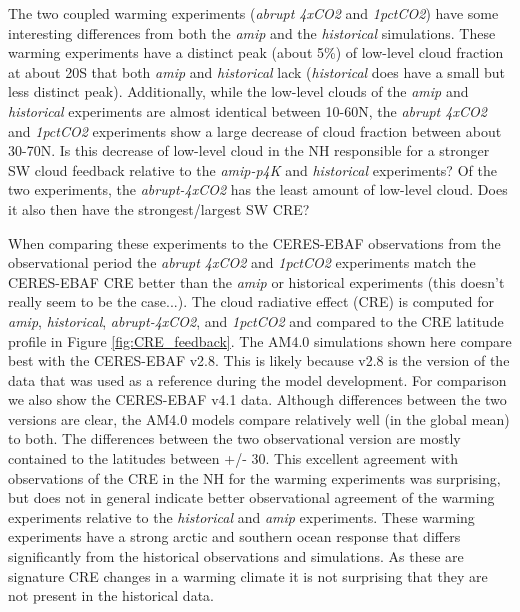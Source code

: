 \documentclass[draft]{agujournal2019}
\begin{document}
The two coupled warming experiments (\textit{abrupt 4xCO2} and \textit{1pctCO2}) have some interesting 
differences from both the \textit{amip} and the \textit{historical} simulations.   
These warming experiments have a distinct peak (about 5\%) of low-level cloud fraction 
 at about 20S that both \textit{amip} and \textit{historical} lack (\textit{historical} does have a small but less distinct peak).  
 Additionally, while the low-level clouds of the \textit{amip} and \textit{historical} experiments are almost identical between 
 10-60N, the \textit{abrupt 4xCO2} and \textit{1pctCO2} experiments show a large decrease of cloud fraction between 
 about 30-70N.  Is this decrease of low-level cloud in the NH responsible for a stronger SW cloud feedback relative to the 
 \textit{amip-p4K} and \textit{historical} experiments?  Of the two experiments, the \textit{abrupt-4xCO2} has the 
 least amount of low-level cloud.   Does it also then have the strongest/largest SW CRE?  
 
 When comparing these experiments to the CERES-EBAF observations from the observational period the 
 \textit{abrupt 4xCO2} and \textit{1pctCO2} experiments match the CERES-EBAF CRE better than the 
 \textit{amip} or historical experiments (this doesn't really seem to be the case...).  
 The cloud radiative effect (CRE) is computed for \textit{amip}, \textit{historical}, \textit{abrupt-4xCO2}, and 
 \textit{1pctCO2} and compared to the CRE latitude profile in Figure \ref{fig:CRE_feedback}.
 The AM4.0 simulations shown here compare best with the CERES-EBAF v2.8.  This is likely because v2.8 
 is the version of the data that was used as a reference during the model development.  For comparison we 
 also show the CERES-EBAF v4.1 data.  Although differences between the two versions are clear, the AM4.0 
 models compare relatively well (in the global mean) to both.  The differences between 
 the two observational version are mostly contained to the latitudes between +/- 30.  This excellent agreement with observations 
 of the CRE in the NH for the warming experiments was surprising, but does not in general indicate better observational 
 agreement of the warming experiments relative to the \textit{historical} and \textit{amip} experiments.   
 These warming experiments have a strong arctic and southern ocean response that differs significantly 
 from the historical observations and simulations.   As these are signature CRE changes in a warming 
 climate it is not surprising that they are not present in the historical data.  
\end{document}
